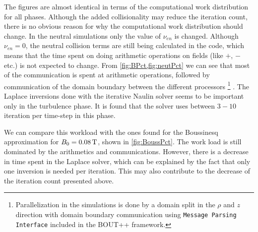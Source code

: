 %
The figures are almost identical in terms of the computational work distribution for all phases.
Although the added collisionality may reduce the iteration count, there is no obvious reason for why the computational work distribution should change.
In the neutral simulations only the value of $\nu_{en}$ is changed.
Although $\nu_{en}=0$, the neutral collision terms are still being calculated in the code, which means that the time spent on doing arithmetic operations on fields (like $+$, $-$ etc.) is not expected to change.
From \cref{fig:BPct,fig:neutPct} we can see that most of the communication is spent at arithmetic operations, followed by communication of the domain boundary between the different processors%
\footnote{Parallelization in the simulations is done by a domain split in the $\rho$ and $z$ direction with domain boundary communication using \texttt{Message Parsing Interface} included in the BOUT++ framework.}%
.
The Laplace inversions done with the iterative Naulin solver seems to be important only in the turbulence phase.
It is found that the solver uses between $3-10$ iteration per time-step in this phase.

We can compare this workload with the ones found for the Boussinesq approximation for $B_0=0.08\, \text{T}$, shown in \cref{fig:BoussPct}.
The work load is still dominated by the arithmetics and communications.
However, there is a decrease in time spent in the Laplace solver, which can be explained by the fact that only one inversion is needed per iteration.
This may also contribute to the decrease of the iteration count presented above.

